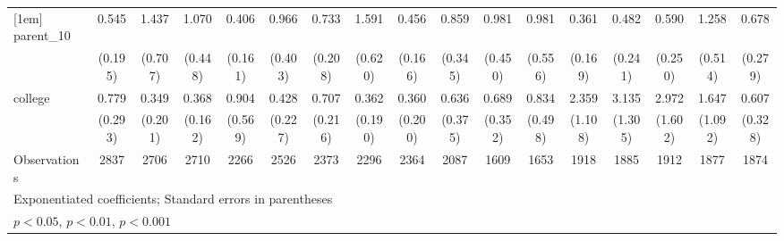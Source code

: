 {\begin{tabular}{l*{16}{c}}
[1em]
parent\_10           &       0.545         &       1.437         &       1.070         &       0.406\sym{*}  &       0.966         &       0.733         &       1.591         &       0.456\sym{*}  &       0.859         &       0.981         &       0.981         &       0.361\sym{*}  &       0.482         &       0.590         &       1.258         &       0.678         \\
                    &     (0.195)         &     (0.707)         &     (0.448)         &     (0.161)         &     (0.403)         &     (0.208)         &     (0.620)         &     (0.166)         &     (0.345)         &     (0.450)         &     (0.556)         &     (0.169)         &     (0.241)         &     (0.250)         &     (0.514)         &     (0.279)         \\
[1em]
college             &       0.779         &       0.349         &       0.368\sym{*}  &       0.904         &       0.428         &       0.707         &       0.362         &       0.360         &       0.636         &       0.689         &       0.834         &       2.359         &       3.135\sym{**} &       2.972\sym{*}  &       1.647         &       0.607         \\
                    &     (0.293)         &     (0.201)         &     (0.162)         &     (0.569)         &     (0.227)         &     (0.216)         &     (0.190)         &     (0.200)         &     (0.375)         &     (0.352)         &     (0.498)         &     (1.108)         &     (1.305)         &     (1.602)         &     (1.092)         &     (0.328)         \\
\hline
Observations        &        2837         &        2706         &        2710         &        2266         &        2526         &        2373         &        2296         &        2364         &        2087         &        1609         &        1653         &        1918         &        1885         &        1912         &        1877         &        1874         \\
\hline\hline
\multicolumn{17}{l}{\footnotesize Exponentiated coefficients; Standard errors in parentheses}\\
\multicolumn{17}{l}{\footnotesize \sym{*} \(p<0.05\), \sym{**} \(p<0.01\), \sym{***} \(p<0.001\)}\\
\end{tabular}
}
